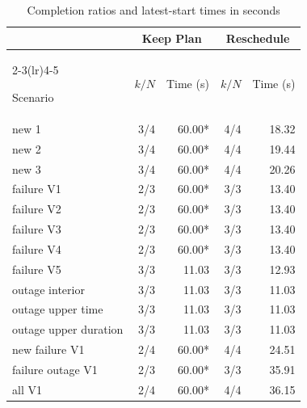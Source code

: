 \documentclass[12pt,a4paper]{article}
\begin{document}
\begin{table}[!ht]

\centering

\caption{Completion ratios and latest-start times in seconds}

\begin{tabular*}{0.96\linewidth}{@{\extracolsep{\fill}}lrrrr@{}}

\toprule

& \multicolumn{2}{c}{Keep Plan} & \multicolumn{2}{c}{Reschedule} \\

\cmidrule(lr){2-3}\cmidrule(lr){4-5}

Scenario & $k/N$ & Time (s) & $k/N$ & Time (s) \\

\midrule

new 1 & 3/4 & 60.00* & 4/4 & 18.32 \\

new 2 & 3/4 & 60.00* & 4/4 & 19.44 \\

new 3 & 3/4 & 60.00* & 4/4 & 20.26 \\

failure V1 & 2/3 & 60.00* & 3/3 & 13.40 \\

failure V2 & 2/3 & 60.00* & 3/3 & 13.40 \\

failure V3 & 2/3 & 60.00* & 3/3 & 13.40 \\

failure V4 & 2/3 & 60.00* & 3/3 & 13.40 \\

failure V5 & 3/3 & 11.03 & 3/3 & 12.93 \\

outage interior & 3/3 & 11.03 & 3/3 & 11.03 \\

outage upper time & 3/3 & 11.03 & 3/3 & 11.03 \\

outage upper duration & 3/3 & 11.03 & 3/3 & 11.03 \\

new failure V1 & 2/4 & 60.00* & 4/4 & 24.51 \\

failure outage V1 & 2/3 & 60.00* & 3/3 & 35.91 \\

all V1 & 2/4 & 60.00* & 4/4 & 36.15 \\


\end{tabular*}
\end{table}
\end{document}
